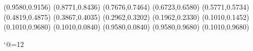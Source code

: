 \PST@Diamond(0.9580,0.9156)
\PST@Diamond(0.8771,0.8436)
\PST@Diamond(0.7676,0.7464)
\PST@Diamond(0.6723,0.6580)
\PST@Diamond(0.5771,0.5734)
\PST@Diamond(0.4819,0.4875)
\PST@Diamond(0.3867,0.4035)
\PST@Diamond(0.2962,0.3202)
\PST@Diamond(0.1962,0.2330)
\PST@Diamond(0.1010,0.1452)
\PST@Border(0.1010,0.9680)
(0.1010,0.0840)
(0.9580,0.0840)
(0.9580,0.9680)
(0.1010,0.9680)

\catcode`@=12
\fi
\endpspicture
